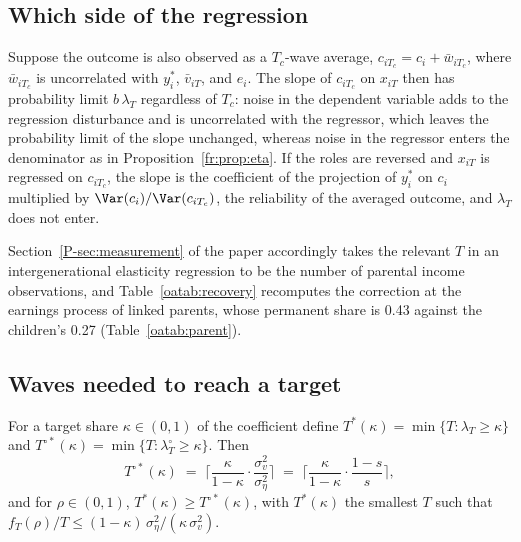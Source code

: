 \subsection{Which side of the regression}
\label{fr:sec:side}

Suppose the outcome is also observed as a $T_c$-wave average,
$c_{iT_c} = c_i + \bar w_{iT_c}$, where $\bar w_{iT_c}$ is uncorrelated
with $y^*_i$, $\bar v_{iT}$, and $e_i$. The slope of $c_{iT_c}$ on
$x_{iT}$ then has probability limit $b\,\lambda_{T}$ regardless of $T_c$:
noise in the dependent variable adds to the regression disturbance and is
uncorrelated with the regressor, which leaves the probability limit of
the slope unchanged, whereas noise in the regressor enters the denominator
as in Proposition~\ref{fr:prop:eta}. If the roles are reversed and $x_{iT}$
is regressed on $c_{iT_c}$, the slope is the coefficient of the projection
of $y^*_i$ on $c_i$ multiplied by $\Var(c_i)/\Var(c_{iT_c})$, the
reliability of the averaged outcome, and $\lambda_T$ does not enter.

Section~\ref{P-sec:measurement} of the paper accordingly takes the
relevant $T$ in an intergenerational elasticity regression to be the
number of parental income observations, and Table~\ref{oatab:recovery}
recomputes the correction at the earnings process of linked
parents, whose permanent share is 0.43 against the children's 0.27
(Table~\ref{oatab:parent}).

\subsection{Waves needed to reach a target}

\begin{proposition}
\label{fr:prop:tstar}
For a target share $\kappa \in (0,1)$ of the coefficient define
$T^*(\kappa) = \min\{T : \lambda_T \ge \kappa\}$ and
$T^{\circ *}(\kappa) = \min\{T : \lambda^{\circ}_T \ge \kappa\}$. Then
\begin{equation}
T^{\circ *}(\kappa) \;=\; \Big\lceil \frac{\kappa}{1-\kappa}\cdot\frac{\sigma^2_v}{\sigma^2_\eta} \Big\rceil
\;=\; \Big\lceil \frac{\kappa}{1-\kappa}\cdot\frac{1-s}{s} \Big\rceil ,
\label{fr:eq:tstar}
\end{equation}
and for $\rho \in (0,1)$, $T^*(\kappa) \ge T^{\circ *}(\kappa)$, with
$T^*(\kappa)$ the smallest $T$ such that
$f_T(\rho)/T \le (1-\kappa)\,\sigma^2_\eta/(\kappa\,\sigma^2_v)$.
\end{proposition}

